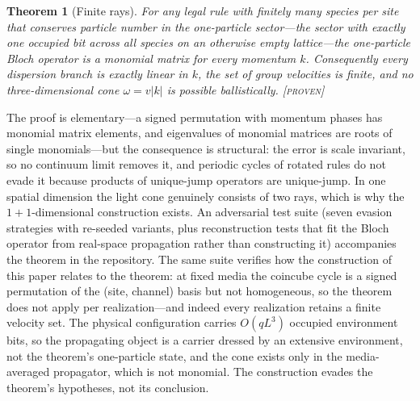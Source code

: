 \documentclass[aps,prd,twocolumn,superscriptaddress,nofootinbib,floatfix]{revtex4-2}
\newtheorem{theorem}{Theorem}
\newcommand{\evP}{\textnormal{\textsc{[proven]}}}
\begin{document}
\begin{theorem}[Finite rays]\label{thm:finiteray}
For any legal rule with finitely many species per site that conserves
particle number in the one-particle sector---the sector with exactly one
occupied bit across all species on an otherwise empty lattice---the
one-particle Bloch operator is a monomial matrix for every momentum $k$. Consequently every dispersion branch is exactly linear in
$k$, the set of group velocities is finite, and no three-dimensional cone
$\omega=v|k|$ is possible ballistically. \evP{}
\end{theorem}

The proof is elementary---a signed permutation with momentum phases has
monomial matrix elements, and eigenvalues of monomial matrices are roots of
single monomials---but the consequence is structural: the error is
scale invariant, so no continuum limit removes it, and periodic cycles of
rotated rules do not evade it because products of unique-jump operators are
unique-jump. In one spatial dimension the light cone genuinely consists of
two rays, which is why the $1+1$-dimensional construction exists. An
adversarial test suite (seven evasion strategies with re-seeded variants,
plus reconstruction tests that fit the Bloch operator from real-space
propagation rather than constructing it) accompanies the theorem in the
repository. The same suite verifies how the construction of this paper
relates to the theorem: at fixed media the coincube cycle is a signed
permutation of the (site, channel) basis but not homogeneous, so the
theorem does not apply per realization---and indeed every realization
retains a finite velocity set. The physical configuration carries
$O(qL^3)$ occupied environment bits, so the propagating object is a
carrier dressed by an extensive environment, not the theorem's
one-particle state, and the cone exists only in the media-averaged
propagator, which is not monomial. The construction evades the
theorem's hypotheses, not its conclusion.
\end{document}
